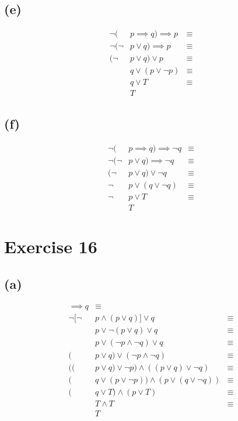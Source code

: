 \documentclass{article}
\begin{document}
\subsection{(e)}
\begin{align*}
	\neg(     & p \implies q) \implies p & \equiv \\
	\neg(\neg & p \lor q) \implies p     & \equiv \\
	(\neg     & p \lor q) \lor p         & \equiv \\
	          & q \lor (p \lor \neg p)   & \equiv \\
	          & q \lor T                 & \equiv \\
	          & T
\end{align*}

\subsection{(f)}
\begin{align*}
	\neg(     & p \implies q) \implies \neg q & \equiv \\
	\neg(\neg & p \lor q) \implies \neg q     & \equiv \\
	(\neg     & p \lor q) \lor \neg q         & \equiv \\
	\neg      & p \lor (q \lor \neg q)        & \equiv \\
	\neg      & p \lor T                      & \equiv \\
	          & T
\end{align*}

\pagebreak

\section{Exercise 16}
\subsection{(a)}
\begin{align*}
	[\neg      & p \land (p \lor q)] \implies q                         & \equiv \\
	\neg [\neg & p \land (p \lor q)] \lor q                             & \equiv \\
	           & p \lor \neg (p \lor q) \lor q                          & \equiv \\
	           & p \lor (\neg p \land \neg q) \lor q                    & \equiv \\
	(          & p \lor q) \lor (\neg p \land \neg q)                   & \equiv \\
	((         & p \lor q) \lor \neg p) \land ((p \lor q) \lor \neg q)  & \equiv \\
	(          & q \lor (p \lor \neg p)) \land (p \lor (q \lor \neg q)) & \equiv \\
	(          & q \lor T) \land (p \lor T)                             & \equiv \\
	           & T \land T                                              & \equiv \\
	           & T
\end{align*}
\end{document}
